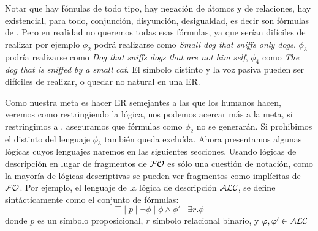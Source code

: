 Notar que hay f\'omulas de todo tipo, hay negaci\'on de \'atomos y de relaciones, hay existencial, para todo, conjunci\'on, disyunci\'on, desigualdad, es decir son f\'ormulas de \FOL. Pero en realidad no queremos todas esas f\'ormulas, ya que ser\'ian dif\'iciles de realizar por ejemplo $\phi_2$ podr\'a realizarse como {\it Small dog that sniffs only dogs}. $\phi_3$ podr\'ia realizarse como {\it Dog that sniffs dogs that are not him self}, $\phi_4$ como {\it The dog that is sniffed by a small cat}. El s\'imbolo distinto y la voz pasiva pueden ser dif\'iciles de realizar, o quedar no natural en una ER.

Como nuestra meta es hacer ER semejantes a las que los humanos hacen, veremos como restringiendo la l\'ogica, nos podemos acercar m\'as a la meta, si restringimos a \EPFOL, aseguramos que f\'ormulas como  $\phi_2$ no se generar\'an. Si prohibimos el distinto del lenguaje  $\phi_3$ tambi\'en queda exclu\'ida.
Ahora presentamos algunas l\'ogicas cuyos lenguajes naremos en las siguientes secciones. Usando l\'ogicas de descripci\'on en lugar de fragmentos de $\mathcal{FO}$ es s\'olo una cuesti\'on de notaci\'on, como la mayor\'ia de l\'ogicas descriptivas se pueden ver
fragmentos como impl\'icitas de $\mathcal{FO}$. Por ejemplo, el lenguaje de la l\'ogica de descripci\'on $\mathcal{ALC}$, se define sint\'acticamente como el conjunto de f\'ormulas:
$$
\top \mid p \mid \neg \phi \mid \phi \wedge \phi' \mid  \exists r. \phi
$$
donde $p$ es un s\'imbolo proposicional, $r$ s\'imbolo relacional binario, y $\varphi,\varphi' \in \mathcal{ALC}$
%
